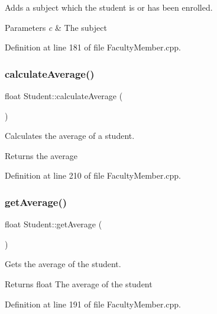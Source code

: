 Adds a subject which the student is or has been enrolled. 
\begin{DoxyParams}{Parameters}
{\em c} & The subject \\
\hline
\end{DoxyParams}


Definition at line 181 of file Faculty\+Member.\+cpp.

\mbox{\label{classStudent_a4bb700692481cee418c225d9fd27317d}} 
\subsubsection{\texorpdfstring{calculate\+Average()}{calculateAverage()}}
{\footnotesize\ttfamily float Student\+::calculate\+Average (\begin{DoxyParamCaption}{ }\end{DoxyParamCaption})}

Calculates the average of a student. \begin{DoxyReturn}{Returns}
the average 
\end{DoxyReturn}


Definition at line 210 of file Faculty\+Member.\+cpp.

\mbox{\label{classStudent_a0d7d2e908da7c3d4b7d1fd7fb4bccf6c}} 
\subsubsection{\texorpdfstring{get\+Average()}{getAverage()}}
{\footnotesize\ttfamily float Student\+::get\+Average (\begin{DoxyParamCaption}{ }\end{DoxyParamCaption})}



Gets the average of the student. 

\begin{DoxyReturn}{Returns}
float The average of the student 
\end{DoxyReturn}


Definition at line 191 of file Faculty\+Member.\+cpp.

\mbox{\label{classStudent_a7ca1414a43b0c0194defe9a7929567a2}} 
